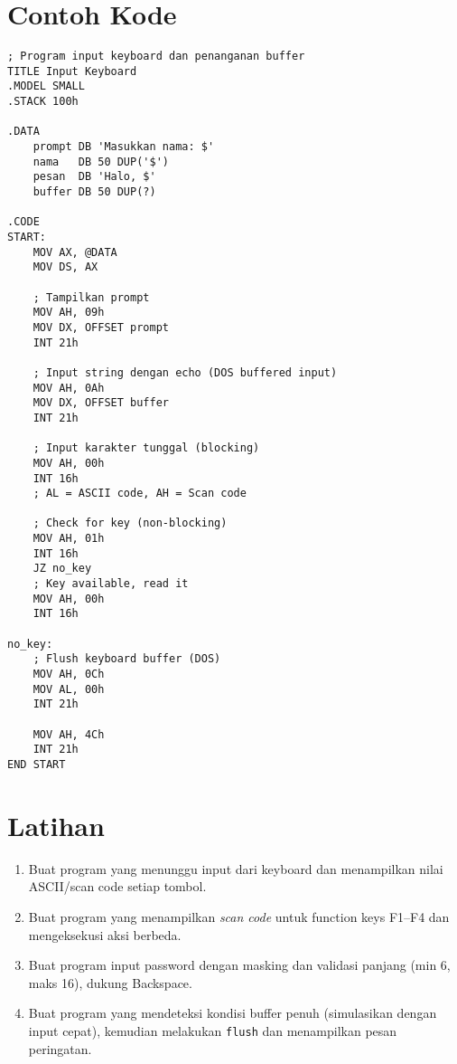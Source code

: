 \section{Contoh Kode}
\begin{verbatim}
; Program input keyboard dan penanganan buffer
TITLE Input Keyboard
.MODEL SMALL
.STACK 100h

.DATA
    prompt DB 'Masukkan nama: $'
    nama   DB 50 DUP('$')
    pesan  DB 'Halo, $'
    buffer DB 50 DUP(?)

.CODE
START:
    MOV AX, @DATA
    MOV DS, AX
    
    ; Tampilkan prompt
    MOV AH, 09h
    MOV DX, OFFSET prompt
    INT 21h
    
    ; Input string dengan echo (DOS buffered input)
    MOV AH, 0Ah
    MOV DX, OFFSET buffer
    INT 21h
    
    ; Input karakter tunggal (blocking)
    MOV AH, 00h
    INT 16h
    ; AL = ASCII code, AH = Scan code
    
    ; Check for key (non-blocking)
    MOV AH, 01h
    INT 16h
    JZ no_key
    ; Key available, read it
    MOV AH, 00h
    INT 16h
    
no_key:
    ; Flush keyboard buffer (DOS)
    MOV AH, 0Ch
    MOV AL, 00h
    INT 21h
    
    MOV AH, 4Ch
    INT 21h
END START
\end{verbatim}

\section{Latihan}
\begin{enumerate}
  \item Buat program yang menunggu input dari keyboard dan menampilkan nilai ASCII/scan code setiap tombol.
  \item Buat program yang menampilkan \textit{scan code} untuk function keys F1--F4 dan mengeksekusi aksi berbeda.
  \item Buat program input password dengan masking dan validasi panjang (min 6, maks 16), dukung Backspace.
  \item Buat program yang mendeteksi kondisi buffer penuh (simulasikan dengan input cepat), kemudian melakukan \texttt{flush} dan menampilkan pesan peringatan.
\end{enumerate}

